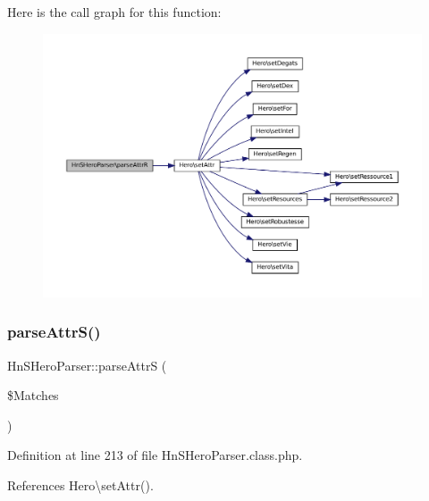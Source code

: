 Here is the call graph for this function\+:\nopagebreak
\begin{figure}[H]
\begin{center}
\leavevmode
\includegraphics[width=350pt]{class_hn_s_hero_parser_adcc83933771af3b55b0fa5c6d08e3dba_cgraph}
\end{center}
\end{figure}
\mbox{\label{class_hn_s_hero_parser_a322f6767efcd5b7b71ce8e9792f9e469}} 
\subsubsection{\texorpdfstring{parse\+Attr\+S()}{parseAttrS()}}
{\footnotesize\ttfamily Hn\+S\+Hero\+Parser\+::parse\+AttrS (\begin{DoxyParamCaption}\item[{}]{\$\+Matches }\end{DoxyParamCaption})\hspace{0.3cm}{\ttfamily [protected]}}



Definition at line 213 of file Hn\+S\+Hero\+Parser.\+class.\+php.



References Hero\textbackslash{}set\+Attr().

